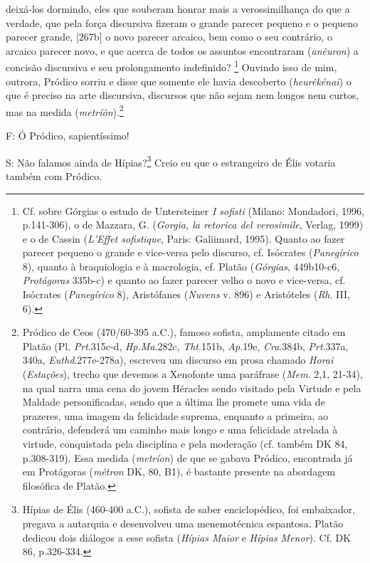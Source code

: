 deixá-los dormindo, eles que souberam honrar mais a verossimilhança do
que a verdade, que pela força discursiva fizeram o grande parecer
pequeno e o pequeno parecer grande, {[}267b{]} o novo parecer arcaico,
bem como o seu contrário, o arcaico parecer novo, e que acerca de todos
os assuntos encontraram (\emph{anêuron}) a concisão discursiva e seu
prolongamento indefinido? \footnote{Cf. sobre Górgias o estudo de
  Untersteiner \emph{I sofisti} (Milano: Mondadori, 1996, p.141-306), o
  de Mazzara, G. (\emph{Gorgia, la retorica del verosimile}, Verlag,
  1999) e o de Cassin (\emph{L'Effet sofistique}, Paris: Galiimard,
  1995). Quanto ao fazer parecer pequeno o grande e vice-versa pelo
  discurso, cf. Isócrates (\emph{Panegírico} 8), quanto à braquiologia e
  à macrologia, cf. Platão (\emph{Górgias}, 449b10-c6, \emph{Protágoras}
  335b-c) e quanto ao fazer parecer velho o novo e vice-versa, cf.
  Isócrates (\emph{Panegírico} 8), Aristófanes (\emph{Nuvens} v. 896) e
  Aristóteles (\emph{Rh}. III, 6).} Ouvindo isso de mim, outrora,
Pródico sorriu e disse que somente ele havia descoberto
(\emph{heurêkénai}) o que é preciso na arte discursiva, discursos que
não sejam nem longos nem curtos, mas na medida
(\emph{metríôn}).\footnote{Pródico de Ceos (470/60-395 a.C.), famoso
  sofista, amplamente citado em Platão (Pl. \emph{Prt}.315c-d,
  \emph{Hp.Ma}.282c, \emph{Tht}.151b, \emph{Ap}.19e, \emph{Cra}.384b,
  \emph{Prt}.337a, 340a, \emph{Euthd}.277e-278a), escreveu um discurso
  em prosa chamado \emph{Horai} (\emph{Estações}), trecho que devemos a
  Xenofonte uma paráfrase (\emph{Mem}. 2,1, 21-34), na qual narra uma
  cena do jovem Héracles sendo visitado pela Virtude e pela Maldade
  personificadas, sendo que a última lhe promete uma vida de prazeres,
  uma imagem da felicidade suprema, enquanto a primeira, ao contrário,
  defenderá um caminho mais longo e uma felicidade atrelada à virtude,
  conquistada pela disciplina e pela moderação (cf. também DK 84,
  p.308-319). Essa medida (\emph{metríon}) de que se gabava Pródico,
  encontrada já em Protágoras (\emph{métron} DK, 80, B1), é bastante
  presente na abordagem filosófica de Platão.}

F: Ó Pródico, sapientíssimo!

S: Não falamos ainda de Hípias?\footnote{Hípias de Élis (460-400 a.C.),
  sofista de saber enciclopédico, foi embaixador, pregava a autarquia e
  desenvolveu uma menemotécnica espantosa. Platão dedicou dois diálogos
  a esse sofista (\emph{Hípias Maior} e \emph{Hípias Menor}). Cf. DK 86,
  p.326-334.} Creio eu que o estrangeiro de Élis votaria também com
Pródico.

